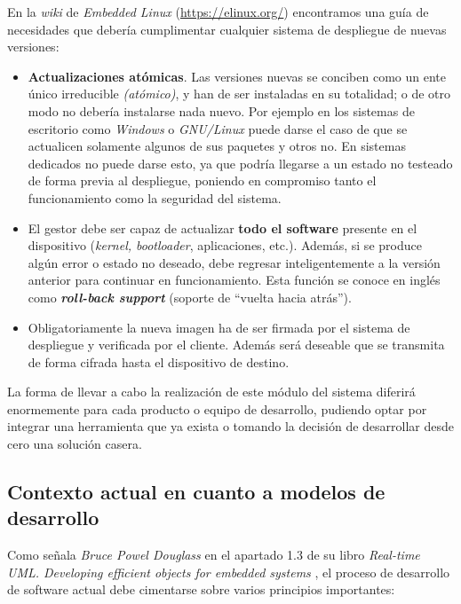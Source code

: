 En la \textit{wiki} de \textit{Embedded Linux} (\url{https://elinux.org/}) encontramos una guía de necesidades que debería cumplimentar cualquier sistema de despliegue de nuevas versiones:

\begin{itemize}
	\item \textbf{Actualizaciones atómicas}. Las versiones nuevas se conciben como un ente único irreducible \textit{(atómico)}, y han de ser instaladas en su totalidad; o de otro modo no debería instalarse nada nuevo. Por ejemplo en los sistemas de escritorio como \textit{Windows} o \textit{GNU/Linux} puede darse el caso de que se actualicen solamente algunos de sus paquetes y otros no. En sistemas dedicados no puede darse esto, ya que podría llegarse a un estado no testeado de forma previa al despliegue, poniendo en compromiso tanto el funcionamiento como la seguridad del sistema.
	\item El gestor debe ser capaz de actualizar \textbf{todo el software} presente en el dispositivo (\textit{kernel, bootloader}, aplicaciones, etc.). Además, si se produce algún error o estado no deseado, debe regresar inteligentemente a la versión anterior para continuar en funcionamiento. Esta función se conoce en inglés como \textbf{\textit{roll-back support}} (soporte de ``vuelta hacia atrás'').
	\item Obligatoriamente la nueva imagen ha de ser firmada por el sistema de despliegue y verificada por el cliente. Además será deseable que se transmita de forma cifrada hasta el dispositivo de destino.
\end{itemize}

La forma de llevar a cabo la realización de este módulo del sistema diferirá enormemente para cada producto o equipo de desarrollo, pudiendo optar por integrar una herramienta que ya exista o tomando la decisión de desarrollar desde cero una solución casera.\\

\subsection{Contexto actual en cuanto a modelos de desarrollo}

Como señala \textit{Bruce Powel Douglass} en el apartado 1.3 de su libro \textit{Real-time UML. Developing efficient objects for embedded systems} \cite{real-time-uml-model-based-development}, el proceso de desarrollo de software actual debe cimentarse sobre varios principios importantes:


